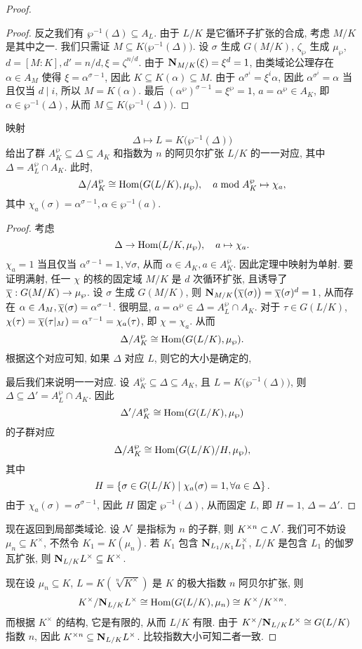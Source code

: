 \begin{proof}
\begin{proof}
反之我们有 $\wp^{-1}(\Delta)\subseteq A_L$. 由于 $L/K$ 是它循环子扩张的合成, 考虑 $M/K$ 是其中之一. 我们只需证 $M\subseteq K\bigl(\wp^{-1}(\Delta)\bigr)$. 设 $\sigma$ 生成 $G(M/K)$, $\zeta_\wp$ 生成 $\mu_\wp$, $d=[M:K],d'=n/d,\xi=\zeta^{n/d}$. 由于 ${\mathbf{N}}_{M/K}(\xi)=\xi^d=1$, 由类域论公理存在 $\alpha\in A_M$ 使得 $\xi=\alpha^{\sigma-1}$, 因此 $K\subseteq K(\alpha)\subseteq M$. 由于 $\alpha^{\sigma^i}=\xi^i\alpha$, 因此 $\alpha^{\sigma^i}=\alpha$ 当且仅当 $d\mid i$, 所以 $M=K(\alpha)$. 最后 $(\alpha^\wp)^{\sigma-1}=\xi^\wp=1$, $a=\alpha^\wp\in A_K$, 即 $\alpha\in\wp^{-1}(\Delta)$, 从而 $M\subseteq K\bigl(\wp^{-1}(\Delta)\bigr)$.
\end{proof}
\begin{theorem}{}{}
映射
  \[\Delta\mapsto L=K\bigl(\wp^{-1}(\Delta)\bigr)\]
给出了群 $A_K^\wp\subseteq \Delta\subseteq A_K$ 和指数为 $n$ 的阿贝尔扩张 $L/K$ 的一一对应, 其中 $\Delta=A_L^\wp\cap A_K$. 此时,
  \[\Delta/A_K^\wp\cong{\mathrm{Hom}}(G(L/K),\mu_\wp),\quad a\bmod A_K^\wp\mapsto \chi_a,\]
其中 $\chi_a(\sigma)=\alpha^{\sigma-1},\alpha\in\wp^{-1}(a)$.
\end{theorem}
\begin{proof}
考虑
  \[\Delta\to {\mathrm{Hom}}(L/K,\mu_\wp),\quad a\mapsto \chi_a.\]
$\chi_a=1$ 当且仅当 $\alpha^{\sigma-1}=1,\forall \sigma$, 从而 $\alpha\in A_K,a\in A_K^\wp$. 因此定理中映射为单射. 要证明满射, 任一 $\chi$ 的核的固定域 $M/K$ 是 $d$ 次循环扩张, 且诱导了 $\overline\chi:G(M/K)\to \mu_\wp$. 设 $\sigma$ 生成 $G(M/K)$, 则 ${\mathbf{N}}_{M/K}\bigl(\overline\chi(\sigma)\bigr)=\overline\chi(\sigma)^d=1$, 从而存在 $\alpha\in A_M,\overline\chi(\sigma)=\alpha^{\sigma-1}$. 很明显, $a=\alpha^\wp\in \Delta=A_L^\wp\cap A_K$. 对于 $\tau\in G(L/K)$, $\chi(\tau)=\overline\chi(\tau|_M)=\alpha^{\tau-1}=\chi_a(\tau)$, 即 $\chi=\chi_a$. 从而
  \[\Delta/A_K^\wp\cong{\mathrm{Hom}}(G(L/K),\mu_\wp).\]
根据这个对应可知, 如果 $\Delta$ 对应 $L$, 则它的大小是确定的, 

最后我们来说明一一对应. 设 $A_K^\wp\subseteq\Delta\subseteq A_K$, 且 $L=K\bigl(\wp^{-1}(\Delta)\bigr)$, 则 $\Delta\subseteq \Delta'=A_L^\wp\cap A_K$. 因此
  \[\Delta'/A_K^\wp\cong {\mathrm{Hom}}(G(L/K),\mu_\wp)\]
的子群对应
  \[\Delta/A_K^\wp\cong {\mathrm{Hom}}(G(L/K)/H,\mu_\wp),\]
其中
  \[H=\left\{\sigma\in G(L/K)\mid \chi_a(\sigma)=1,\forall a\in\Delta\right\}.\]
由于 $\chi_a(\sigma)=\sigma^{\sigma-1}$, 因此 $H$ 固定 $\wp^{-1}(\Delta)$, 从而固定 $L$, 即 $H=1$, $\Delta=\Delta'$.
\end{proof}

现在返回到局部类域论. 设 ${\mathcal{N}}$ 是指标为 $n$ 的子群, 则 $K^{\times n}\subset {\mathcal{N}}$. 我们可不妨设 $\mu_n\subseteq K^\times$, 不然令 $K_1=K(\mu_n)$. 若 $K_1$ 包含 ${\mathbf{N}}_{L_1/K_1}L_1^\times$, $L/K$ 是包含 $L_1$ 的伽罗瓦扩张, 则 ${\mathbf{N}}_{L/K}L^\times\subseteq K^\times$.

现在设 $\mu_n\subseteq K$, $L=K(\sqrt[n]{K^\times})$ 是 $K$ 的极大指数 $n$ 阿贝尔扩张, 则
  \[K^\times/{\mathbf{N}}_{L/K}L^\times\cong {\mathrm{Hom}}(G(L/K),\mu_n)\cong K^\times/K^{\times n}.\]
而根据 $K^\times$ 的结构, 它是有限的, 从而 $L/K$ 有限. 由于 $K^\times/{\mathbf{N}}_{L/K}L^\times\cong G(L/K)$ 指数 $n$, 因此 $K^{\times n}\subseteq {\mathbf{N}}_{L/K}L^\times$. 比较指数大小可知二者一致. 
\end{proof}


